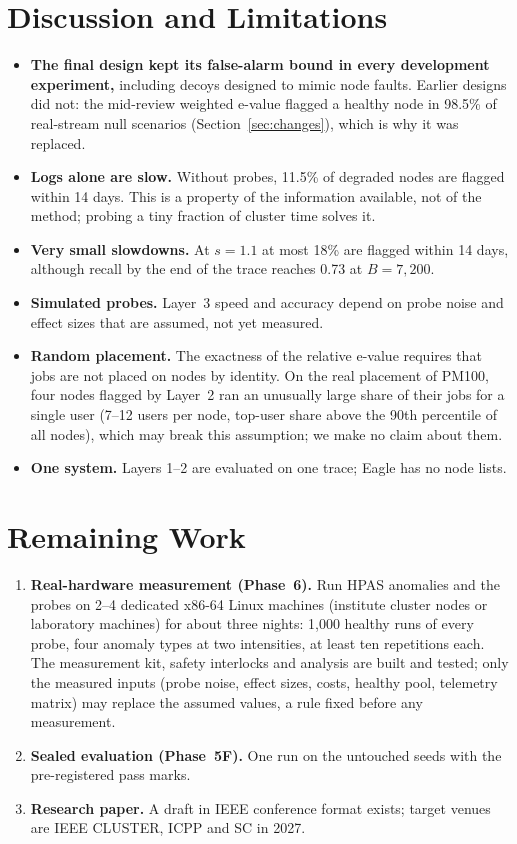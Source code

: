\documentclass[10pt,a4paper]{article}
\begin{document}
\section{Discussion and Limitations}
\begin{itemize}
\item \textbf{The final design kept its false-alarm bound in every development experiment,} including decoys designed to mimic node faults. Earlier designs did not: the mid-review weighted e-value flagged a healthy node in 98.5\% of real-stream null scenarios (Section~\ref{sec:changes}), which is why it was replaced.
\item \textbf{Logs alone are slow.} Without probes, 11.5\% of degraded nodes are flagged within 14 days. This is a property of the information available, not of the method; probing a tiny fraction of cluster time solves it.
\item \textbf{Very small slowdowns.} At $s = 1.1$ at most 18\% are flagged within 14 days, although recall by the end of the trace reaches 0.73 at $B = 7{,}200$.
\item \textbf{Simulated probes.} Layer~3 speed and accuracy depend on probe noise and effect sizes that are assumed, not yet measured.
\item \textbf{Random placement.} The exactness of the relative e-value requires that jobs are not placed on nodes by identity. On the real placement of PM100, four nodes flagged by Layer~2 ran an unusually large share of their jobs for a single user (7--12 users per node, top-user share above the 90th percentile of all nodes), which may break this assumption; we make no claim about them.
\item \textbf{One system.} Layers 1--2 are evaluated on one trace; Eagle has no node lists.
\end{itemize}

\section{Remaining Work}
\begin{enumerate}
\item \textbf{Real-hardware measurement (Phase~6).} Run HPAS anomalies and the probes on 2--4 dedicated x86-64 Linux machines (institute cluster nodes or laboratory machines) for about three nights: 1{,}000 healthy runs of every probe, four anomaly types at two intensities, at least ten repetitions each. The measurement kit, safety interlocks and analysis are built and tested; only the measured inputs (probe noise, effect sizes, costs, healthy pool, telemetry matrix) may replace the assumed values, a rule fixed before any measurement.
\item \textbf{Sealed evaluation (Phase~5F).} One run on the untouched seeds with the pre-registered pass marks.
\item \textbf{Research paper.} A draft in IEEE conference format exists; target venues are IEEE CLUSTER, ICPP and SC in 2027.
\end{enumerate}
\end{document}
